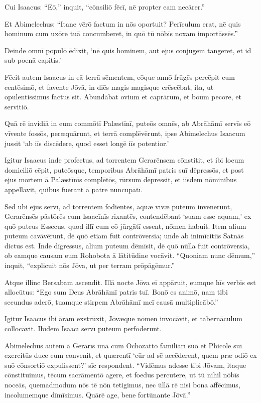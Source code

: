 Cui Isaacus: ``Eō,'' inquit, ``cōnsiliō fēcī, nē propter eam necārer.''

\Versus Et Abimelechus: ``Itane vērō factum in nōs oportuit? Perīculum erat, nē quis hominum cum uxōre tuā concumberet, in quō tū nōbīs noxam importāssēs.''

\Versus Deinde omnī populō ēdīxit, `nē quis hominem, aut ejus conjugem tangeret, et id sub poenā capitis.'

\Versus Fēcit autem Isaacus in eā terrā sēmentem, eōque annō frūgēs percēpit cum centēsimō, et favente Jōvā, in diēs magis magisque crēscēbat,
\Versus ita, ut opulentissimus factus sit.
\Versus Abundābat ovium et caprārum, et boum pecore, et servitiō.

Quā rē invidiā in eum commōtī Palæstīnī,
\Versus puteōs omnēs, ab Abrāhāmī servīs eō vīvente fossōs, peræquārunt, et terrā complēvērunt,
\Versus ipse Abimelechus Isaacum jussit `ab iīs discēdere, quod esset longē iīs potentior.'

\Versus Igitur Isaacus inde profectus, ad torrentem Gerarēnsem cōnstitit, et ibi locum domiciliō cēpit,
\Versus puteōsque, temporibus Abrāhāmī patris suī dēpressōs, et post ejus mortem ā Palæstīnīs complētōs, rūrsum dēpressit, et iīsdem nōminibus appellāvit, quibus fuerant ā patre nuncupātī.

\Versus Sed ubi ejus servī, ad torrentem fodientēs, aquæ vīvæ puteum invēnērunt,
\Versus Gerarēnsēs pāstōrēs cum Isaacīnīs rixantēs, contendēbant `suam esse aquam,' ex quō puteus Essecus, quod illī cum eō jūrgātī essent, nōmen habuit.
\Versus Item alium puteum cavāvērunt, dē quō etiam fuit contrōversia; unde ab inimīcitiīs Satnās dictus est.
\Versus Inde dīgressus, alium puteum dēmīsit, dē quō nūlla fuit contrōversia, ob eamque causam eum Rohobota ā lātitūdine vocāvit. ``Quoniam nunc dēmum,'' inquit, ``explicuit nōs Jōva, ut per terram prōpāgēmur.''

\Versus Atque illinc Bersabam ascendit.
\Versus Illā nocte Jōva eī appāruit, eumque hīs verbīs est allocūtus: ``Ego sum Deus Abrāhāmī patris tuī. Bonō es animō, nam tibi secundus aderō, tuamque stirpem Abrāhāmī meī causā multiplicābō.''

\Versus Igitur Isaacus ibi āram exstrūxit, Jōvæque nōmen invocāvit, et tabernāculum collocāvit. Ibīdem Isaacī servī puteum perfōdērunt.

\Versus Abimelechus autem ā Gerārīs ūnā cum Ochozattō familiārī suō et Phicole suī exercitūs duce eum convenit,
\Versus et quærentī `cūr ad sē accēderent, quem præ odiō ex suō cōnsortiō expulissent?' sīc respondent.
\Versus ``Vidēmus adesse tibi Jōvam, itaque cōnstituimus, tēcum sacrāmentō agere, et foedus percutere,
\Versus ut tū nihil nōbīs noceās, quemadmodum nōs tē nōn tetigimus, nec ūllā rē nisi bona affēcimus, incolumemque dīmīsimus. Quārē age, bene fortūnante Jōvā.''

